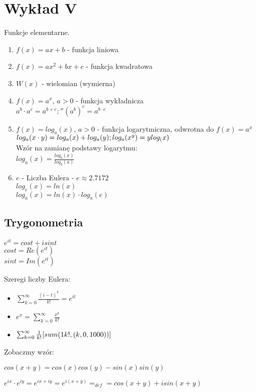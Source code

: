 \documentclass{article}
\theoremstyle{definition}
\theoremstyle{definition}
\theoremstyle{definition}
\theoremstyle{definition}
\begin{document}
\section{Wykład V}

Funkcje elementarne.
\begin{enumerate}
    \item $f(x)=ax+b$ - funkcja liniowa
    \item $f(x)=ax^2+bx+c$ - funkcja kwadratowa
    \item $W(x)$ - wielomian (wymierna)
    \item $f(x)=a^x$, $a>0$ - funkcja wykładnicza\\
    $a^b\cdot a^c=a^{b+c};'' (a^b)^c=a^{b\cdot c}$
    \item $f(x)=log_a(x)$, $a>0$ - funkcja logarytmiczna, odwrotna do $f(x)=a^x$\\
    $log_a(x\cdot y)=log_a(x)+log_a(y);\\ log_a(x^y)=ylog_(x)$\\
    Wzór na zamianę podstawy logarytmu:\\
    $log_a(x)=\frac{log_b(x)}{log_b(a)}$
    \item $e$ - Liczba Eulera - $e\approx 2.7172$\\
    $log_e(x)=ln(x)$\\
    $log_a(x)=ln(x)\cdot log_a(e)$
\end{enumerate}

\subsection{Trygonometria}
\begin{center}
$e^{it}=cost + isint$\\
$cost = Re(e^{it})$\\
$sint = Im(e^{it})$
\end{center}

Szeregi liczby Eulera:
\begin{itemize}
    \item $\sum_{k=0}^{\infty} \frac{(i-t)^k}{k!}=e^{it}$
    \item $e^x = \sum_{k=0}^{\infty} \frac{x^k}{k!}$
    \item $\sum_{k=0}^{\infty} \frac{1}{k!} [sum(1\/k!, (k,0,1000))]$
\end{itemize}

Zobaczmy wzór:

$cos(x+y)=cos(x)cos(y)-sin(x)sin(y)$

$e^{ix}\cdot e^{iy} = e^{ix + iy}=e^{i(x+y)}=_{def}=cos(x+y)+isin(x+y)$
\end{document}
